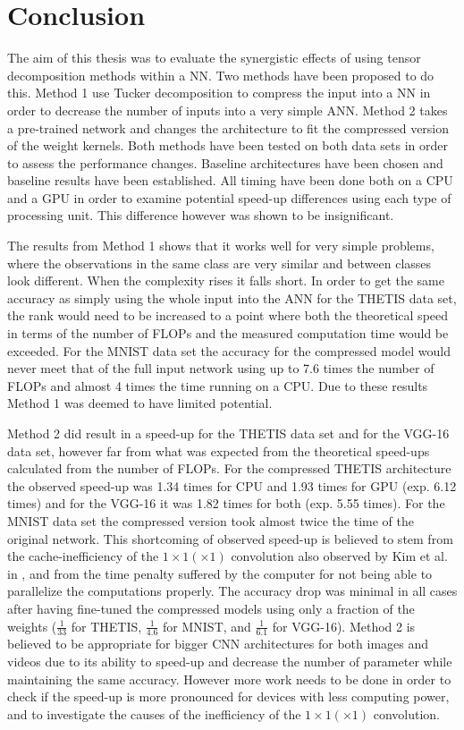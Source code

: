 \section{Conclusion} \label{tex:conclusion}
The aim of this thesis was to evaluate the synergistic effects of using tensor decomposition methods within a NN. Two methods have been proposed to do this. Method 1 use Tucker decomposition to compress the input into a NN in order to decrease the number of inputs into a very simple ANN. Method 2 takes a pre-trained network and changes the architecture to fit the compressed version of the weight kernels. Both methods have been tested on both data sets in order to assess the performance changes. Baseline architectures have been chosen and baseline results have been established. All timing have been done both on a CPU and a GPU in order to examine potential speed-up differences using each type of processing unit. This difference however was shown to be insignificant.

The results from Method 1 shows that it works well for very simple problems, where the observations in the same class are very similar and between classes look different. When the complexity rises it falls short. In order to get the same accuracy as simply using the whole input into the ANN for the THETIS data set, the rank would need to be increased to a point where both the theoretical speed in terms of the number of FLOPs and the measured computation time would be exceeded. For the MNIST data set the accuracy for the compressed model would never meet that of the full input network using up to 7.6 times the number of FLOPs and almost 4 times the time running on a CPU. Due to these results Method 1 was deemed to have limited potential.

Method 2 did result in a speed-up for the THETIS data set and for the VGG-16 data set, however far from what was expected from the theoretical speed-ups calculated from the number of FLOPs. For the compressed THETIS architecture the observed speed-up was 1.34 times for CPU and 1.93 times for GPU (exp. 6.12 times) and for the VGG-16 it was 1.82 times for both (exp. 5.55 times). For the MNIST data set the compressed version took almost twice the time of the original network. This shortcoming of observed speed-up is believed to stem from the cache-inefficiency of the $1\times 1 (\times 1)$ convolution also observed by Kim et al. in \cite{Kim2016}, and from the time penalty suffered by the computer for not being able to parallelize the computations properly. The accuracy drop was minimal in all cases after having fine-tuned the compressed models using only a fraction of the weights ($\frac{1}{33}$ for THETIS, $\frac{1}{4.6}$ for MNIST, and $\frac{1}{6.1}$ for VGG-16). Method 2 is believed to be appropriate for bigger CNN architectures for both images and videos due to its ability to speed-up and decrease the number of parameter while maintaining the same accuracy. However more work needs to be done in order to check if the speed-up is more pronounced for devices with less computing power, and to investigate the causes of the inefficiency of the $1\times 1(\times 1)$ convolution.